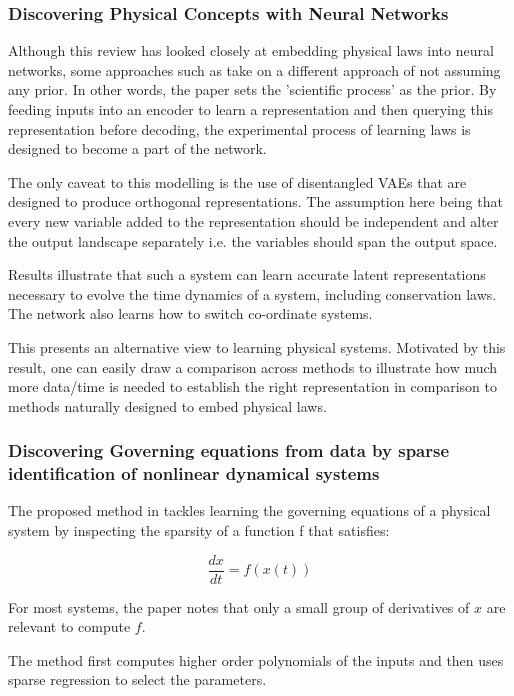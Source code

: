 \documentclass{article}
\begin{document}
\subsubsection{Discovering Physical Concepts with Neural Networks}

Although this review has looked closely at embedding physical laws into neural networks, some approaches such as \cite{iten_discovering_2020} take on a different approach of not assuming any prior. In other words, the paper sets the 'scientific process' as the prior. By feeding inputs into an encoder to learn a representation and then querying this representation before decoding, the experimental process of learning laws is designed to become a part of the network.

The only caveat to this modelling is the use of disentangled VAEs that are designed to produce orthogonal representations. The assumption here being that every new variable added to the representation should be independent and alter the output landscape separately i.e. the variables should span the output space.

Results illustrate that such a system can learn accurate latent representations necessary to evolve the time dynamics of a system, including conservation laws. The network also learns how to switch co-ordinate systems.

This presents an alternative view to learning physical systems. Motivated by this result, one can easily draw a comparison across methods to illustrate how much more data/time is needed to establish the right representation in comparison to methods naturally designed to embed physical laws. 

\subsubsection{Discovering Governing equations from data by sparse identification of nonlinear dynamical systems}

The proposed method in \cite{brunton_discovering_2016} tackles learning the governing equations of a physical system by inspecting the sparsity of a function f that satisfies:
 
 $$ \frac{dx}{dt} = f(x(t)) $$
 
For most systems, the paper notes that only a small group of derivatives of $x$ are relevant to compute $f$. 
 
The method first computes higher order polynomials of the inputs and then uses sparse regression to select the parameters. 
 
\end{document}
